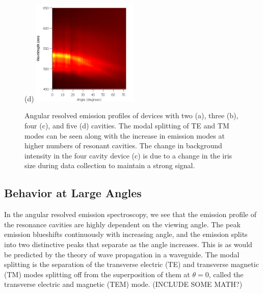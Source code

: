 \documentclass{report}
\begin{document}
\begin{figure}[h!]
            (d)
            \includegraphics[width=0.45\textwidth]{images/n5_heatmap.png}
            \caption{Angular resolved emission profiles of devices with two (a), three (b), four (c), and five (d) cavities. The modal splitting of TE and TM modes can be seen along with the increase in emission modes at higher numbers of resonant cavities. The change in background intensity in the four cavity device (c) is due to a change in the iris size during data collection to maintain a strong signal.}
            \label{fig:heatmaps}
		\end{figure}
    
        \subsection{Behavior at Large Angles} \label{largeAngle}
		In the angular resolved emission spectroscopy, we see that the emission profile of the resonance cavities are highly dependent on the viewing angle. The peak emission blueshifts continuously with increasing angle, and the emission splits into two distinctive peaks that separate as the angle increases. This is as would be predicted by the theory of wave propagation in a waveguide. The modal splitting is the separation of the transverse electric (TE) and transverse magnetic (TM) modes splitting off from the superposition of them at $\theta=0$, called the transverse electric and magnetic (TEM) mode. (INCLUDE SOME MATH?)

    
\end{document}

